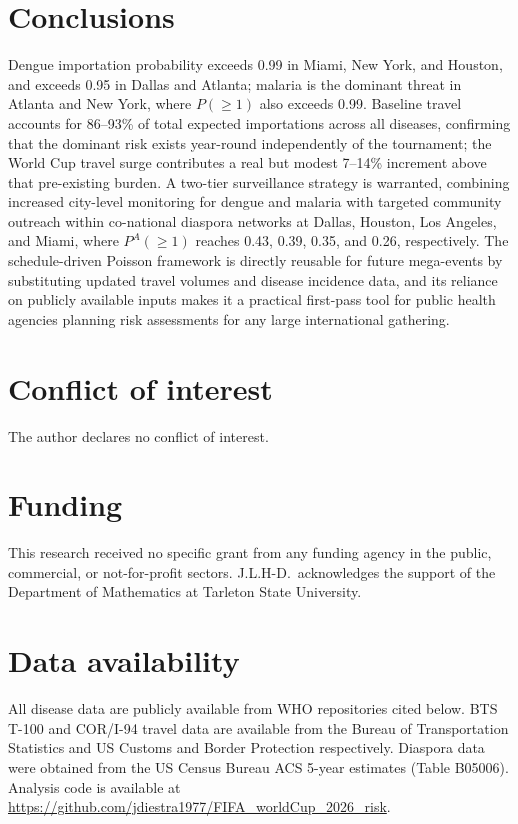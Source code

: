 \documentclass[12pt, a4paper]{article}
\begin{document}
\section{Conclusions}

Dengue importation probability exceeds 0.99 in Miami, New York, and Houston, and exceeds 0.95 in Dallas and Atlanta; malaria is the dominant threat in Atlanta and New York, where $P(\geq 1)$ also exceeds 0.99. Baseline travel accounts for 86--93\% of total expected importations across all diseases, confirming that the dominant risk exists year-round independently of the tournament; the World Cup travel surge contributes a real but modest 7--14\% increment above that pre-existing burden. A two-tier surveillance strategy is warranted, combining increased city-level monitoring for dengue and malaria with targeted community outreach within co-national diaspora networks at Dallas, Houston, Los Angeles, and Miami, where $P^A(\geq 1)$ reaches 0.43, 0.39, 0.35, and 0.26, respectively. The schedule-driven Poisson framework is directly reusable for future mega-events by substituting updated travel volumes and disease incidence data, and its reliance on publicly available inputs makes it a practical first-pass tool for public health agencies planning risk assessments for any large international gathering.

\section*{Conflict of interest}
The author declares no conflict of interest.

\section*{Funding}
This research received no specific grant from any funding agency in the public, commercial, or not-for-profit sectors. J.L.H-D.\ acknowledges the support of the Department of Mathematics at Tarleton State University.   

\section*{Data availability}
All disease data are publicly available from WHO repositories cited
below. BTS T-100 and COR/I-94 travel data are available from the
Bureau of Transportation Statistics and US Customs and Border
Protection respectively. Diaspora data were obtained from the
US Census Bureau ACS 5-year estimates (Table B05006).
Analysis code is available at \url{https://github.com/jdiestra1977/FIFA\_worldCup\_2026\_risk}.
\end{document}
